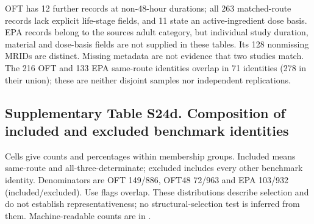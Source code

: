 OFT has 12 further records at non-48-hour durations; all 263 matched-route records lack explicit life-stage fields, and 11 state an active-ingredient dose basis. EPA records belong to the source\textquotesingle s adult category, but individual study duration, material and dose-basis fields are not supplied in these tables. Its 128 nonmissing MRIDs are distinct. Missing metadata are not evidence that two studies match. The 216 OFT and 133 EPA same-route identities overlap in 71 identities (278 in their union); these are neither disjoint samples nor independent replications.

\subsection*{Supplementary Table S24d. Composition of included and excluded benchmark identities}

Cells give counts and percentages within membership groups. Included means same-route and all-three-determinate; excluded includes every other benchmark identity. Denominators are OFT 149/886, OFT48 72/963 and EPA 103/932 (included/excluded). Use flags overlap. These distributions describe selection and do not establish representativeness; no structural-selection test is inferred from them. Machine-readable counts are in .

\begingroup\footnotesize\setlength{\tabcolsep}{4pt}

